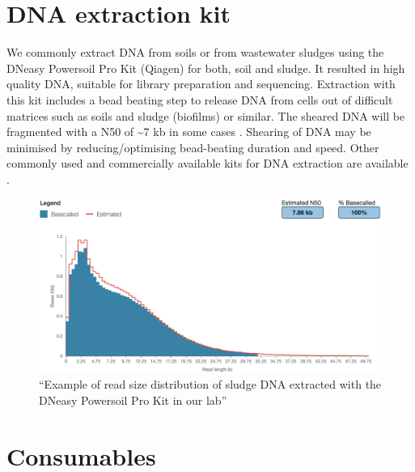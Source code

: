 \documentclass[
]{book}
\begin{document}
\section{DNA extraction kit}\label{dna-extraction-kit}

We commonly extract DNA from soils or from wastewater sludges using the DNeasy Powersoil Pro Kit (Qiagen) for both, soil and sludge. It resulted in high quality DNA, suitable for library preparation and sequencing. Extraction with this kit includes a bead beating step to release DNA from cells out of difficult matrices such as soils and sludge (biofilms) or similar. The sheared DNA will be fragmented with a N50 of \textasciitilde7 kb in some cases \citep{Jensen2024}. Shearing of DNA may be minimised by reducing/optimising bead-beating duration and speed. Other commonly used and commercially available kits for DNA extraction are available \citep{Jensen2024, Gand2023}.

\begin{figure}
\centering
\includegraphics[width=6.25in,height=\textheight]{./img/readsize.png}
\caption{``Example of read size distribution of sludge DNA extracted with the DNeasy Powersoil Pro Kit in our lab''}
\end{figure}

\section{Consumables}\label{consumables}
\end{document}

